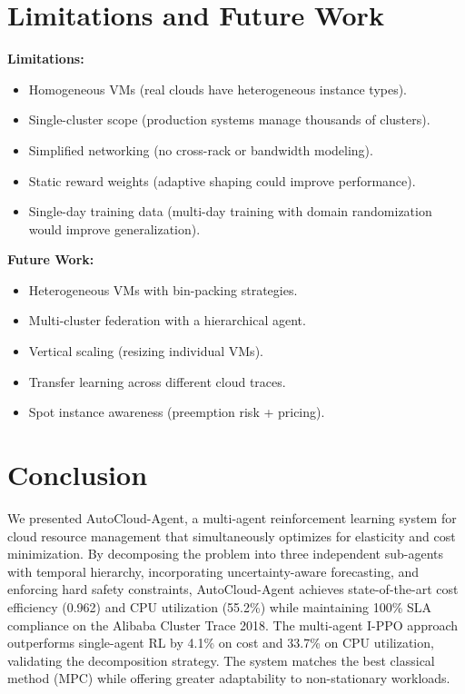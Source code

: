 \documentclass[12pt,a4paper]{article}
\begin{document}
\section{Limitations and Future Work}


\textbf{Limitations:}
\begin{itemize}
  \item Homogeneous VMs (real clouds have heterogeneous instance types).
  \item Single-cluster scope (production systems manage thousands of clusters).
  \item Simplified networking (no cross-rack or bandwidth modeling).
  \item Static reward weights (adaptive shaping could improve performance).
  \item Single-day training data (multi-day training with domain randomization
        would improve generalization).
\end{itemize}

\textbf{Future Work:}
\begin{itemize}
  \item Heterogeneous VMs with bin-packing strategies.
  \item Multi-cluster federation with a hierarchical agent.
  \item Vertical scaling (resizing individual VMs).
  \item Transfer learning across different cloud traces.
  \item Spot instance awareness (preemption risk + pricing).
\end{itemize}


\section{Conclusion}


We presented AutoCloud-Agent, a multi-agent reinforcement learning system for
cloud resource management that simultaneously optimizes for elasticity and cost
minimization. By decomposing the problem into three independent sub-agents with
temporal hierarchy, incorporating uncertainty-aware forecasting, and enforcing
hard safety constraints, AutoCloud-Agent achieves state-of-the-art cost
efficiency (0.962) and CPU utilization (55.2\%) while maintaining 100\% SLA
compliance on the Alibaba Cluster Trace 2018. The multi-agent I-PPO approach
outperforms single-agent RL by 4.1\% on cost and 33.7\% on CPU utilization,
validating the decomposition strategy. The system matches the best classical
method (MPC) while offering greater adaptability to non-stationary workloads.
\end{document}
